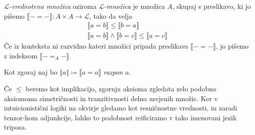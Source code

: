 



\begin{definicija}
  \emph{\(ℒ\)-vrednotena množica} oziroma \emph{\(ℒ\)-množica} je množica \(A\),
  skupaj s preslikavo, ki jo pišemo \(⟦- = -⟧ : A×A → ℒ\), tako da velja
  \begin{align*}
    ⟦ a = b ⟧ ≤ ⟦ b = a ⟧\\
    ⟦ a = b ⟧ ∧ ⟦ b = c ⟧ ≤ ⟦ a = c ⟧
  \end{align*}
  Če iz konteksta ni razvidno kateri množici pripada preslikava \(⟦- = -⟧\),
  jo pišemo z indeksom \(⟦- =_A -⟧\).

  Kot zgoraj naj bo \(‖a‖ ≔ ⟦a = a⟧\) \emph{razpon \(a\)}.
\end{definicija}

Če \(≤\) beremo kot implikacijo, zgornja aksioma zgledata zelo podobno aksiomoma
simetričnosti in tranzitivnosti delno urejenih množic. Ker v intuicionistični
logiki na okvirje gledamo kot resničnostne vrednosti, in zaradi tenzor-hom
adjunkcije, lahko to podobnost reificiramo v tako imenovani jezik triposa.

